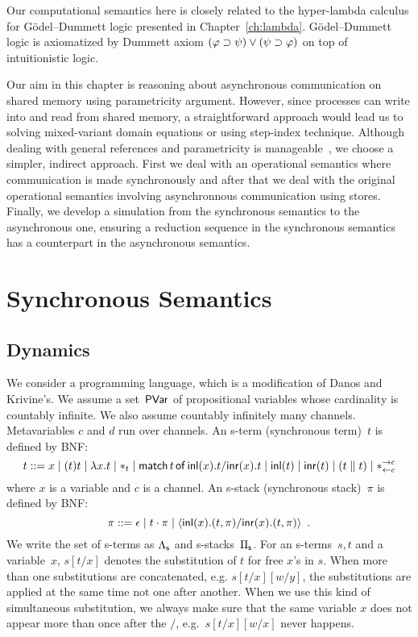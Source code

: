 Our computational semantics here is closely related to
the hyper-lambda calculus for G\"odel--Dummett logic presented in
Chapter~\ref{ch:lambda}.
G\"odel--Dummett logic is axiomatized by Dummett axiom $(\varphi\supset\psi)\lor(\psi\supset\varphi)$
on top of intuitionistic logic.  

Our aim in this chapter is reasoning about asynchronous communication on
shared memory using parametricity argument.
However, since processes can write into and read from shared memory,
a straightforward approach would lead us to solving mixed-variant domain
equations or using step-index technique.
Although dealing with general references and parametricity
is manageable~\citep{birkedal2009relational},
we choose a simpler, indirect approach.
First we deal with an operational semantics where communication is made
synchronously and after that we deal with the original operational
semantics involving asynchronnous communication using stores.
Finally, we develop a simulation from the synchronous semantics to the
asynchronous one, ensuring a reduction sequence in the synchronous
semantics has a counterpart in the asynchronous semantics.

\section{Synchronous Semantics}
\label{sec:sync}

\subsection{Dynamics}
We consider a programming language, which is a modification of
Danos and Krivine's.
We assume a set~$\mathsf{PVar}$ of propositional variables whose cardinality is
countably infinite.
We also assume countably infinitely many channels.
Metavariables $c$ and $d$ run over channels.
An s-term (synchronous term)~$t$ is defined by BNF:
\[
 t::= x
 \mid (t)t
 \mid \lambda x.t
 \mid \ast_t
 \mid \mathsf{match}\,{t}\,\mathsf{of}\, \mathsf{inl}({x}). {t}/ \mathsf{inr}({x}). {t}
 \mid \mathsf{inl}({t})
 \mid \mathsf{inr}({t})
 \mid (t\parallel t)
 \mid \ast^{\rightarrow {c}}_{\leftarrow{c}}
\]
where $x$ is a variable and $c$ is a channel.
An s-stack (synchronous stack)~$\pi$ is defined by BNF:
\[
 \pi ::= \epsilon
 \mid t\cdot \pi
 \mid \langle \mathsf{inl}({x}). ({t},{\pi})/ \mathsf{inr}({x}). ({t},{\pi})\rangle
 \enspace.
\]
We write the set of s-terms as $\Lambda_{\mathsf s}$ and s-stacks~$\Pi_{\mathsf s}$.
For an s-terms~$s,t$ and a variable~$x$, $s[t/x]$ denotes the
substitution of $t$ for free $x$'s in $s$.  When more than one
substitutions are concatenated, e.g. $s[t/x][w/y]$, the substitutions
are applied at the same time not one after another.  When we use this
kind of simultaneous substitution, we always make sure that the same
variable $x$ does not appear more than once after the $/$,
e.g.~$s[t/x][w/x]$ never happens.

